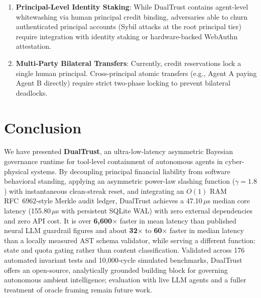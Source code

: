 \documentclass[manuscript, screen, review]{jair}
\begin{document}
\begin{enumerate}[leftmargin=12pt, topsep=2pt, itemsep=1pt]
\item \textbf{Principal-Level Identity Staking}: While DualTrust contains agent-level whitewashing via human principal credit binding, adversaries able to churn authenticated principal accounts (Sybil attacks at the root principal tier) require integration with identity staking or hardware-backed WebAuthn attestation.
\item \textbf{Multi-Party Bilateral Transfers}: Currently, credit reservations lock a single human principal. Cross-principal atomic transfers (e.g., Agent A paying Agent B directly) require strict two-phase locking to prevent bilateral deadlocks.
\end{enumerate}

\section{Conclusion}
\label{sec:conclusion}
We have presented \textbf{DualTrust}, an ultra-low-latency asymmetric Bayesian governance runtime for tool-level containment of autonomous agents in cyber-physical systems. By decoupling principal financial liability from software behavioral standing, applying an asymmetric power-law slashing function ($\gamma = 1.8$) with instantaneous clean-streak reset, and integrating an $O(1)$ RAM RFC~6962-style Merkle audit ledger, DualTrust achieves a 47.10\,$\mu$s median core latency (155.80\,$\mu$s with persistent SQLite WAL) with zero external dependencies and zero API cost. It is over \textbf{6,600$\times$} faster in mean latency than published neural LLM guardrail figures and about \textbf{32$\times$} to \textbf{60$\times$} faster in median latency than a locally measured AST schema validator, while serving a different function: state and quota gating rather than content classification. Validated across 176 automated invariant tests and 10,000-cycle simulated benchmarks, DualTrust offers an open-source, analytically grounded building block for governing autonomous ambient intelligence; evaluation with live LLM agents and a fuller treatment of oracle framing remain future work.
\end{document}
